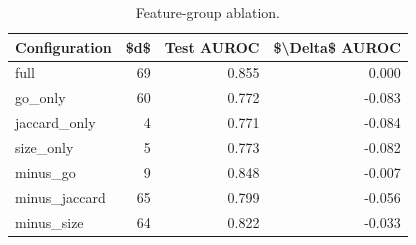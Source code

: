 \begin{table}[htbp]
\centering
\caption{Feature-group ablation.}
\label{tab:ablation_recomputed}
\begin{tabular}{lrrr}
\toprule
Configuration & \$d\$ & Test AUROC & \$\textbackslash Delta\$ AUROC \\
\midrule
full & 69 & 0.855 & 0.000 \\
go\_only & 60 & 0.772 & -0.083 \\
jaccard\_only & 4 & 0.771 & -0.084 \\
size\_only & 5 & 0.773 & -0.082 \\
minus\_go & 9 & 0.848 & -0.007 \\
minus\_jaccard & 65 & 0.799 & -0.056 \\
minus\_size & 64 & 0.822 & -0.033 \\
\bottomrule
\end{tabular}

\end{table}
